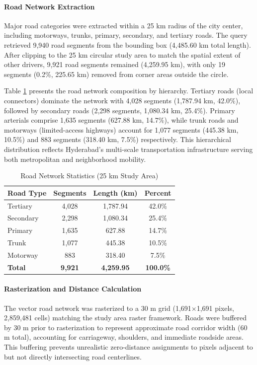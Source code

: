 \documentclass[conference]{IEEEtran}
\begin{document}
\paragraph{Road Network Extraction}
Major road categories were extracted within a 25 km radius of the city center, including motorways, trunks, primary, secondary, and tertiary roads. The query retrieved 9,940 road segments from the bounding box (4,485.60 km total length). After clipping to the 25 km circular study area to match the spatial extent of other drivers, 9,921 road segments remained (4,259.95 km), with only 19 segments (0.2\%, 225.65 km) removed from corner areas outside the circle.

Table \ref{tab:road_network} presents the road network composition by hierarchy. Tertiary roads (local connectors) dominate the network with 4,028 segments (1,787.94 km, 42.0\%), followed by secondary roads (2,298 segments, 1,080.34 km, 25.4\%). Primary arterials comprise 1,635 segments (627.88 km, 14.7\%), while trunk roads and motorways (limited-access highways) account for 1,077 segments (445.38 km, 10.5\%) and 883 segments (318.40 km, 7.5\%) respectively. This hierarchical distribution reflects Hyderabad's multi-scale transportation infrastructure serving both metropolitan and neighborhood mobility.

\begin{table}[!t]
\caption{Road Network Statistics (25 km Study Area)}
\label{tab:road_network}
\centering
\small
\renewcommand{\arraystretch}{1.2}
\begin{tabular}{lccc}
\toprule
\textbf{Road Type} & \textbf{Segments} & \textbf{Length (km)} & \textbf{Percent} \\
\midrule
Tertiary & 4,028 & 1,787.94 & 42.0\% \\
Secondary & 2,298 & 1,080.34 & 25.4\% \\
Primary & 1,635 & 627.88 & 14.7\% \\
Trunk & 1,077 & 445.38 & 10.5\% \\
Motorway & 883 & 318.40 & 7.5\% \\
\midrule
\textbf{Total} & \textbf{9,921} & \textbf{4,259.95} & \textbf{100.0\%} \\
\bottomrule
\end{tabular}
\end{table}

\paragraph{Rasterization and Distance Calculation}
The vector road network was rasterized to a 30 m grid (1,691$\times$1,691 pixels, 2,859,481 cells) matching the study area raster framework. Roads were buffered by 30 m prior to rasterization to represent approximate road corridor width (60 m total), accounting for carriageway, shoulders, and immediate roadside areas. This buffering prevents unrealistic zero-distance assignments to pixels adjacent to but not directly intersecting road centerlines.
\end{document}
